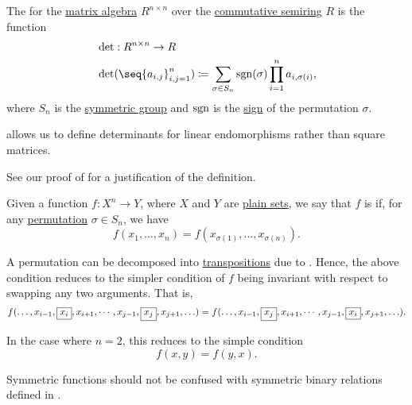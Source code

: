 \begin{definition}\label{def:matrix_determinant}
  The  for the \hyperref[thm:matrix_algebra]{matrix algebra} \( R^{n \times n} \) over the \hyperref[def:semiring/commutative]{commutative semiring} \( R \) is the function
  \begin{equation}\label{eq:def:matrix_determinant}
    \begin{aligned}
      &\det: R^{n \times n} \to R \\
      &\det(\seq{ a_{i,j} }_{i,j=1}^n) \coloneqq \sum_{\sigma \in S_n} \sgn(\sigma) \prod_{i=1}^n a_{i,\sigma(i)},
    \end{aligned}
  \end{equation}
  where \( S_n \) is the \hyperref[def:symmetric_group]{symmetric group} and \( \operatorname{sgn} \) is the \hyperref[def:permutation_parity]{sign} of the permutation \( \sigma \).

   allows us to define determinants for linear endomorphisms rather than square matrices.

  See our proof of  for a justification of the definition.
\end{definition}

\begin{definition}\label{def:symmetric_function}
  Given a function \( f: X^n \to Y \), where \( X \) and \( Y \) are \hyperref[def:set]{plain sets}, we say that \( f \) is  if, for any \hyperref[def:symmetric_group]{permutation} \( \sigma \in S_n \), we have
  \begin{equation*}
    f(x_1, \ldots, x_n) = f(x_{\sigma(1)}, \ldots, x_{\sigma(n)}).
  \end{equation*}

  A permutation can be decomposed into \hyperref[def:cyclic_permutation]{transpositions} due to . Hence, the above condition reduces to the simpler condition of \( f \) being invariant with respect to swapping any two arguments. That is,
  \begin{equation*}
    f(\ldots, x_{i-1}, \fbox{\( x_i \)}, x_{i+1}, \cdots, x_{j-1}, \fbox{\( x_j \)}, x_{j+1}, \ldots)
    =
    f(\ldots, x_{i-1}, \fbox{\( x_j \)}, x_{i+1}, \cdots, x_{j-1}, \fbox{\( x_i \)}, x_{j+1}, \ldots).
  \end{equation*}

  In the case where \( n = 2 \), this reduces to the simple condition
  \begin{equation*}
    f(x, y) = f(y, x).
  \end{equation*}

  Symmetric functions should not be confused with symmetric binary relations defined in .
\end{definition}

